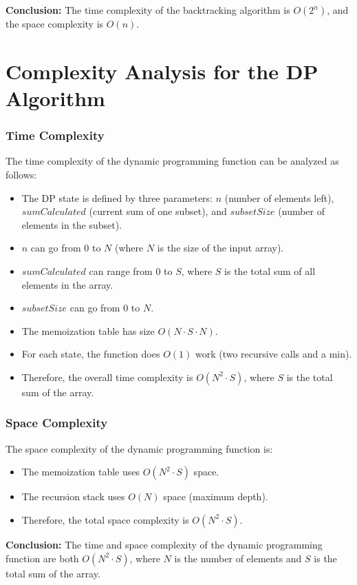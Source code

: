 \documentclass{article}
\begin{document}
\textbf{Conclusion:} The time complexity of the backtracking algorithm is $O(2^n)$, and the space complexity is $O(n)$.

\newpage

\section*{Complexity Analysis for the DP Algorithm}

\subsubsection*{Time Complexity}
The time complexity of the dynamic programming function can be analyzed as follows:
\begin{itemize}
    \item The DP state is defined by three parameters: $n$ (number of elements left), $sumCalculated$ (current sum of one subset), and $subsetSize$ (number of elements in the subset).
    \item $n$ can go from $0$ to $N$ (where $N$ is the size of the input array).
    \item $sumCalculated$ can range from $0$ to $S$, where $S$ is the total sum of all elements in the array.
    \item $subsetSize$ can go from $0$ to $N$.
    \item The memoization table has size $O(N \cdot S \cdot N)$.
    \item For each state, the function does $O(1)$ work (two recursive calls and a min).
    \item Therefore, the overall time complexity is $O(N^2 \cdot S)$, where $S$ is the total sum of the array.
\end{itemize}

\subsubsection*{Space Complexity}
The space complexity of the dynamic programming function is:
\begin{itemize}
    \item The memoization table uses $O(N^2 \cdot S)$ space.
    \item The recursion stack uses $O(N)$ space (maximum depth).
    \item Therefore, the total space complexity is $O(N^2 \cdot S)$.
\end{itemize}

\textbf{Conclusion:} The time and space complexity of the dynamic programming function are both $O(N^2 \cdot S)$, where $N$ is the number of elements and $S$ is the total sum of the array.
\end{document}
